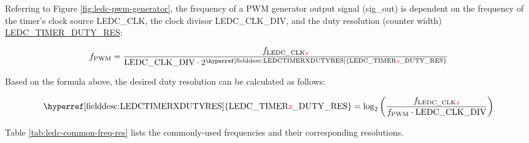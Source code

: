 \documentclass[main\_\_EN.tex]{subfiles}
\begin{document}
Referring to Figure \ref{fig:ledc-pwm-generator}, the frequency of a PWM generator output signal (sig\_out) is dependent on the frequency of the timer's clock source LEDC\_CLK, the clock divisor LEDC\_CLK\_DIV, and the duty resolution (counter width) \hyperref[fielddesc:LEDCTIMERXDUTYRES]{LEDC\_TIMER\_DUTY\_RES}:

    \[
    f_{\textrm{PWM}}=\frac{f_{\textrm{LEDC\_CLK\regindex{x}}}}
                        {\textrm{LEDC\_CLK\_DIV}\cdot 2^{\textrm{\hyperref[fielddesc:LEDCTIMERXDUTYRES]{LEDC\_TIMER\regindex{x}\_DUTY\_RES}}}}
    \]

Based on the formula above, the desired duty resolution can be calculated as follows:

    \[
    \textrm{\hyperref[fielddesc:LEDCTIMERXDUTYRES]{LEDC\_TIMER\regindex{x}\_DUTY\_RES}}
    =\log_2\left(\frac{f_{\textrm{LEDC\_CLK\regindex{x}}}}
    {f_{\textrm{PWM}}\cdot \textrm{LEDC\_CLK\_DIV}}\right)
    \]

Table \ref{tab:ledc-common-freq-res} lists the commonly-used frequencies and their corresponding resolutions.
\end{document}
